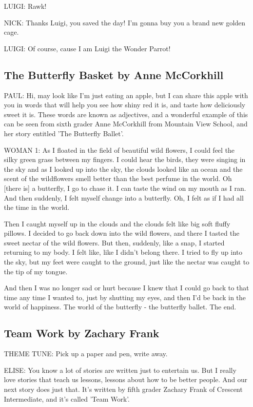 LUIGI:
Rawk!

NICK:
Thanks Luigi, you saved the day!
I'm gonna buy you a brand new golden cage.

LUIGI:
Of course, cause I am Luigi the Wonder Parrot!

\subsection{The Butterfly Basket by Anne McCorkhill}

PAUL:
Hi, may look like I'm just eating an apple, but I can share this apple with you in words that will help you see how shiny red it is, and taste how deliciously sweet it is.
These words are known as adjectives, and a wonderful example of this can be seen from sixth grader Anne McCorkhill from Mountain View School, and her story entitled 'The Butterfly Ballet'.

WOMAN 1:
As I floated in the field of beautiful wild flowers, I could feel the silky green grass between my fingers.
I could hear the birds, they were singing in the sky and as I looked up into the sky, the clouds looked like an ocean and the scent of the wildflowers smell better than the best perfume in the world.
Oh [there is] a butterfly, I go to chase it.
I can taste the wind on my mouth as I ran.
And then suddenly, I felt myself change into a butterfly.
Oh, I felt as if I had all the time in the world.

Then I caught myself up in the clouds and the clouds felt like big soft fluffy pillows.
I decided to go back down into the wild flowers, and there I tasted the sweet nectar of the wild flowers.
But then, suddenly, like a snap, I started returning to my body.
I felt like, like I didn't belong there.
I tried to fly up into the sky, but my feet were caught to the ground, just like the nectar was caught to the tip of my tongue.

And then I was no longer sad or hurt because I knew that I could go back to that time any time I wanted to, just by shutting my eyes, and then I'd be back in the world of happiness.
The world of the butterfly - the butterfly ballet.
The end.

\subsection{Team Work by Zachary Frank}

THEME TUNE:
Pick up a paper and pen, write away.

ELISE:
You know a lot of stories are written just to entertain us.
But I really love stories that teach us lessons, lessons about how to be better people.
And our next story does just that.
It's written by fifth grader Zachary Frank of Crescent Intermediate, and it's called 'Team Work'.

